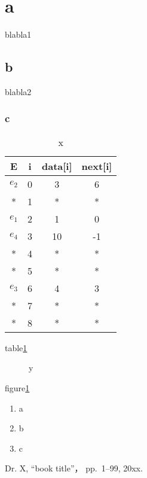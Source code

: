 \documentclass[a4j,twoside]{jarticle}
\begin{document}
\section{a}
blabla1
\subsection{b}
blabla2
\subsubsection{c}
\begin{table}[t]
	\center
	\begin{tabular}{|c||c|c|c|} \hline
		  E   & i & data[i] & next[i] \\ \hline \hline
		$e_2$ & 0 &    3    &    6    \\
		  *   & 1 &    *    &    *    \\
		$e_1$ & 2 &    1    &    0    \\
		$e_4$ & 3 &   10    &   -1    \\
		  *   & 4 &    *    &    *    \\
		  *   & 5 &    *    &    *    \\
		$e_3$ & 6 &    4    &    3    \\
		  *   & 7 &    *    &    *    \\
		  *   & 8 &    *    &    *    \\ \hline
	\end{tabular}
	\caption{x}
	\label{tab:x}
\end{table}

table\ref{tab:x}

\begin{figure}[t]
	\center
	\caption{y}
	\label{fig:y}
\end{figure}

figure\ref{fig:y}

\begin{enumerate}
	\item a
	\item b
	\item c
\end{enumerate}

\begin{thebibliography}{99}
		Dr. X,
		``book title''，
		pp.\ 1--99, 20xx.
\end{thebibliography}
\end{document}

